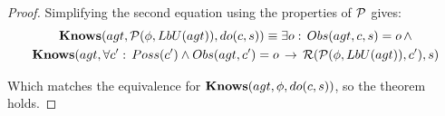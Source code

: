 \begin{proof}
Simplifying the second equation using the properties of $\mathcal{P}$ gives:\begin{multline*}
\mathbf{Knows}(agt,\mathcal{P}(\phi,LbU(agt)),do(c,s))\equiv\exists o:\, Obs(agt,c,s)=o\,\wedge\\
\mathbf{Knows}(agt,\forall c':\, Poss(c')\wedge Obs(agt,c')=o\,\rightarrow\,\mathcal{R}(\mathcal{P}(\phi,LbU(agt)),c'),s)\end{multline*}


Which matches the equivalence for $\mathbf{Knows}(agt,\phi,do(c,s))$, so
the theorem holds. 
\end{proof}
\medskip{}


